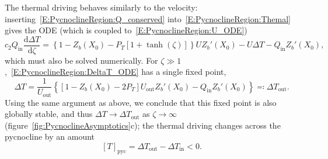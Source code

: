 \documentclass[openacc]{rsproca_new}%
\newcommand{\dd}[2]{\frac{\mathrm{d} #1}{\mathrm{d} #2}}
\newcommand{\Pt}{\textit{P}_T}
\newcommand{\ctwo}{c_2}  %
\renewcommand{\in}{\text{in}} %
\newcommand{\out}{\text{out}}
\begin{document}
The thermal driving behaves similarly to the velocity: inserting~\eqref{E:PycnoclineRegion:Q_conserved} into~\eqref{E:PycnoclineRegion:Themal} gives the ODE (which is coupled to~\eqref{E:PycnoclineRegion:U_ODE})
\begin{equation}\label{E:PycnoclineRegion:DeltaT_ODE}
\ctwo Q_\in \dd{\Delta T}{\zeta} = \left\{1 - Z_b(X_0) - \Pt\left[1 + \tanh(\zeta)\right]\right\}UZ_b'(X_0) - U\Delta T - Q_\in Z_b'(X_0), 
\end{equation}
which must also be solved numerically. For $\zeta \gg 1$,~\eqref{E:PycnoclineRegion:DeltaT_ODE} has a single fixed point,
\begin{equation}\label{E:PycnoclineRegion:DeltaT_Limit}
\Delta T = \frac{1}{U_\out}\left\{\left[1 - Z_b(X_0) - 2\Pt\right]U_\out Z_b'(X_0) - Q_\in Z_b'(X_0)\right\} \eqcolon \Delta T_\out.
\end{equation}
Using the same argument as above, we conclude that this fixed point is also globally stable, and thus $\Delta T \to \Delta T_\out$ as $\zeta \to \infty$ (figure~\ref{fig:PycnoclineAsymptotics}c); the thermal driving changes across the pycnocline by an amount 
\begin{equation}\label{E:PycnoclineRegion:DeltaT_change}
\left[T\right]_{\text{pyc}} = \Delta T_\out - \Delta T_\in < 0.
\end{equation} 
\end{document}
